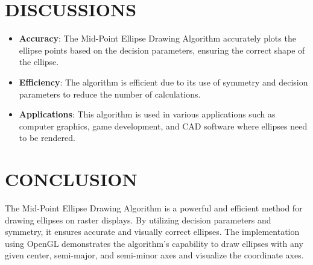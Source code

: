 \documentclass{article}
\begin{document}
\section*{DISCUSSIONS}
\begin{itemize}
    \item \textbf{Accuracy}: The Mid-Point Ellipse Drawing Algorithm accurately plots the ellipse points based on the decision parameters, ensuring the correct shape of the ellipse.
    \item \textbf{Efficiency}: The algorithm is efficient due to its use of symmetry and decision parameters to reduce the number of calculations.
    \item \textbf{Applications}: This algorithm is used in various applications such as computer graphics, game development, and CAD software where ellipses need to be rendered.
\end{itemize}

\section*{CONCLUSION}
The Mid-Point Ellipse Drawing Algorithm is a powerful and efficient method for drawing ellipses on raster displays. By utilizing decision parameters and symmetry, it ensures accurate and visually correct ellipses. The implementation using OpenGL demonstrates the algorithm's capability to draw ellipses with any given center, semi-major, and semi-minor axes and visualize the coordinate axes.
\end{document}
